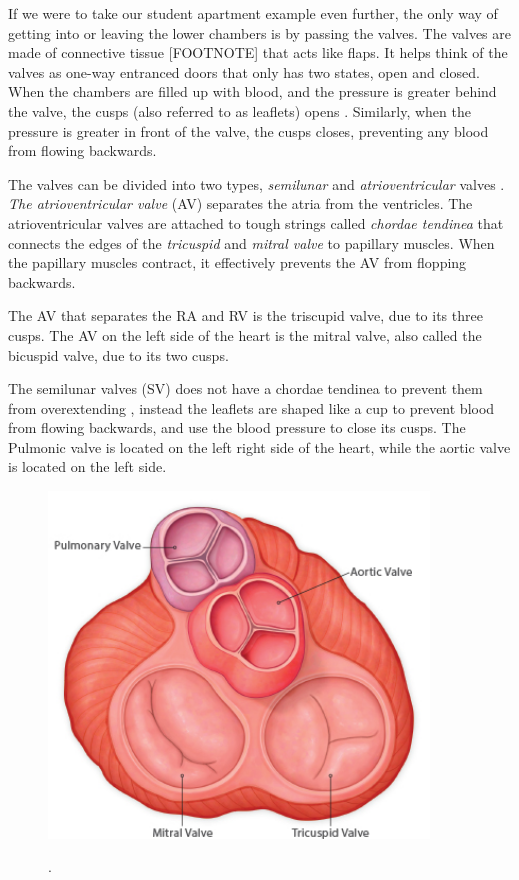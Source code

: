 If we were to take our student apartment example even further, the only way of getting into or leaving the lower chambers is by passing the valves. The valves are made of connective tissue \cite{article17}[FOOTNOTE] that acts like flaps. It helps think of the valves as one-way entranced doors that only has two states, open and closed. When the chambers are filled up with blood, and the pressure is greater behind the valve, the cusps (also referred to as leaflets) opens  \cite{article22}. Similarly, when the pressure is greater in front of the valve, the cusps closes, preventing any blood from flowing backwards. 

The valves can be divided into two types, \textit{semilunar} and \textit{atrioventricular} valves \cite{article19}. \textit{The atrioventricular valve} (AV) separates the atria from the ventricles. The atrioventricular valves are attached to tough strings called \textit{chordae tendinea} that connects the edges of the \textit{tricuspid} and  \textit{mitral valve} to papillary muscles. When the papillary muscles contract, it effectively prevents the AV from flopping backwards. \cite{article18}

The  AV that separates the RA and RV is the triscupid valve, due to its three cusps. The AV on the left side of the heart is the mitral valve, also called the bicuspid valve, due to its two cusps. 

The semilunar valves (SV) does not have a chordae tendinea to prevent them from overextending \cite{article20}, instead the leaflets are shaped like a cup to prevent blood from flowing backwards, and use the blood pressure to close its cusps. The Pulmonic valve is located on the left right side of the heart, while the aortic valve is located on the left side.

\begin{figure}[h]
 \centering 
     \includegraphics[width=0.9\textwidth]{bilder/b_heart_valves}
     \caption{\cite{pic4}}.
     \label{b_heart_valves.png}
\end{figure}


